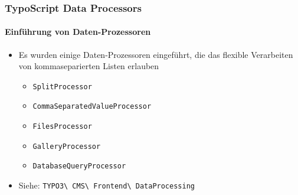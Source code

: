 \begin{frame}[fragile]
	\frametitle{TypoScript Data Processors}
	\framesubtitle{Einführung von Daten-Prozessoren}

	\lstset{basicstyle=\tiny\ttfamily}

	\begin{itemize}

		\item Es wurden einige Daten-Prozessoren eingeführt, die das flexible Verarbeiten von kommaseparierten Listen erlauben

			\begin{itemize}
				\item \texttt{SplitProcessor}
				\item \texttt{CommaSeparatedValueProcessor}
				\item \texttt{FilesProcessor}
				\item \texttt{GalleryProcessor}
				\item \texttt{DatabaseQueryProcessor}
			\end{itemize}

		\item Siehe:
			\texttt{TYPO3\textbackslash
				CMS\textbackslash
				Frontend\textbackslash
				DataProcessing}

	\end{itemize}

\end{frame}


